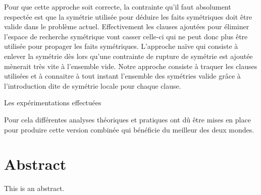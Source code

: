 Pour que cette approche soit correcte, la contrainte qu'il faut absolument respectée est que la symétrie utilisée pour déduire les
faits symétriques doit être valide dans le problème actuel. Effectivement les clauses ajoutées pour éliminer l'espace de recherche
symétrique vont casser celle-ci qui ne peut donc plus être utilisée pour propager les faits symétriques.
L'approche naïve qui consiste à enlever la symétrie dès lors qu'une contrainte de rupture de symétrie est ajoutée mènerait très vite
à l'ensemble vide. Notre approche consiste à traquer les clauses utilisées et à connaitre à tout instant l'ensemble des symétries
valide grâce à l'introduction dite de symétrie locale pour chaque clause.

Les expérimentations effectuées 


Pour cela différentes analyses théoriques et pratiques ont dû être mises en place pour produire cette version
combinée qui bénéficie du meilleur des deux mondes.

\chapter*{Abstract}

This is an abstract.
